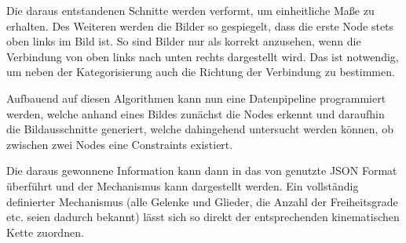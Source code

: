 Die daraus entstandenen Schnitte werden verformt, um einheitliche Maße zu erhalten.
Des Weiteren werden die Bilder so gespiegelt, dass die erste Node stets oben links im Bild ist.
So sind Bilder nur als korrekt anzusehen, wenn die Verbindung von oben links nach unten rechts dargestellt wird.
Das ist notwendig, um neben der Kategorisierung auch die Richtung der Verbindung zu bestimmen.

Aufbauend auf diesen Algorithmen kann nun eine Datenpipeline programmiert werden, welche anhand eines Bildes zunächst die Nodes erkennt und daraufhin die Bildausschnitte generiert, welche dahingehend untersucht werden können, ob zwischen zwei Nodes eine Constraints existiert.

Die daraus gewonnene Information kann dann in das von  genutzte JSON Format überführt und der Mechanismus kann dargestellt werden.
Ein vollständig definierter Mechanismus (alle Gelenke und Glieder, die Anzahl der Freiheitsgrade etc. seien dadurch bekannt) lässt sich so direkt der entsprechenden kinematischen Kette zuordnen.
